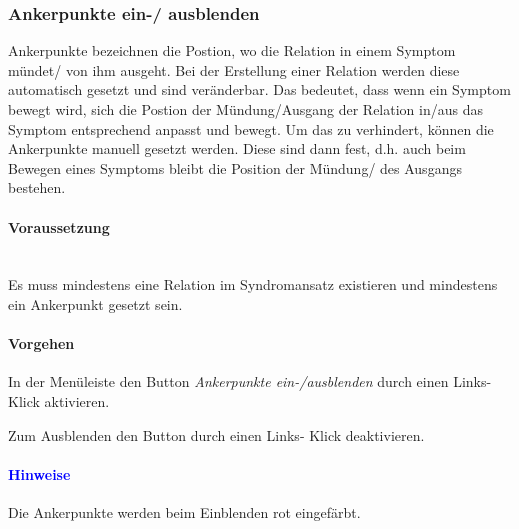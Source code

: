 \documentclass[enabledeprecatedfontcommands,fontsize=11pt,paper=a4,twoside]{scrartcl}
\newcounter{one}
\newcounter{two}[one]
\newcommand*{\hint}{\paragraph{\textcolor{blue}{Hinweise}}}
\newcommand*{\condition}{\paragraph{Voraussetzung}$\;$ \vspace{0.2cm}\\}
\newcommand*{\action}{\paragraph{Vorgehen}}
\let\tempone\itemize
\let\temptwo\enditemize
\renewenvironment{itemize}{\tempone\addtolength{\itemsep}{-10.0pt}}{\temptwo}
\let\origenumerate\enumerate
\let\origendenumerate\endenumerate
\renewenvironment{enumerate}{\origenumerate \addtolength{\itemsep}{-10.0pt}}{\origendenumerate}
\begin{document}
\subsubsection{Ankerpunkte ein-/ ausblenden}
		Ankerpunkte bezeichnen die Postion, wo die Relation in einem Symptom mündet/ von ihm ausgeht. Bei der Erstellung einer Relation werden diese automatisch gesetzt und sind veränderbar. Das bedeutet, dass wenn ein Symptom bewegt wird, sich die Postion der Mündung/Ausgang der Relation in/aus das Symptom entsprechend anpasst und bewegt. Um das zu verhindert, können die Ankerpunkte manuell gesetzt werden. Diese sind dann fest, d.h. auch beim Bewegen eines Symptoms bleibt die Position der Mündung/ des Ausgangs bestehen.
		\condition
		Es muss mindestens eine Relation im Syndromansatz existieren und mindestens ein Ankerpunkt gesetzt sein. 
		\action
		\begin{enumerate}
			\item In der Menüleiste den Button \textit{Ankerpunkte ein-/ausblenden} durch einen Links- Klick aktivieren.
			\item Zum Ausblenden den Button durch einen Links- Klick deaktivieren. 
		\end{enumerate}
		\hint
		\begin{itemize}
			\item Die Ankerpunkte werden beim Einblenden rot eingefärbt. 
		\end{itemize}
		\begin{figure}[ht!]
			\centering
		\end{figure}
		
		\newpage
\end{document}
